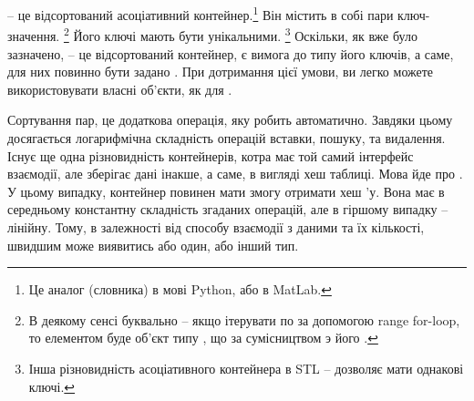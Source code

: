 \documentclass[12pt]{article}
\begin{document}
	\section{}
	\href{https://en.cppreference.com/w/cpp/container/map}{} -- це відсортований асоціативний контейнер.\footnote{Це аналог  (словника) в мові Python, або  в MatLab.}
	Він містить в собі пари ключ-значення. \footnote{В деякому сенсі буквально -- якщо ітерувати по  за допомогою range for-loop, то елементом буде об'єкт типу , що за сумісництвом э його .}
	Його ключі мають бути унікальними. \footnote{Інша різновидність асоціативного контейнера в STL -- \href{https://en.cppreference.com/w/cpp/container/multimap}{} дозволяє мати однакові ключі.}
	Оскільки, як вже було зазначено,  -- це відсортований контейнер, є вимога до типу його ключів, а саме, для них повинно бути задано . При дотримання цієї умови, ви легко можете використовувати власні об'єкти, як  для . 
	
	Сортування пар, це додаткова операція, яку  робить автоматично. Завдяки цьому досягається логарифмічна складність операцій вставки, пошуку, та видалення. Існує ще одна різновидність контейнерів, котра має той самий інтерфейс взаємодії, але зберігає дані інакше, а саме, в вигляді хеш таблиці. Мова йде про \href{https://en.cppreference.com/w/cpp/container/unordered_map}{}. У цьому випадку, контейнер повинен мати змогу отримати хеш 'у. Вона має в середньому константну складність згаданих операцій, але в гіршому випадку -- лінійну. Тому, в залежності від способу взаємодії з даними та їх кількості, швидшим може виявитись або один, або інший тип.
\end{document}
